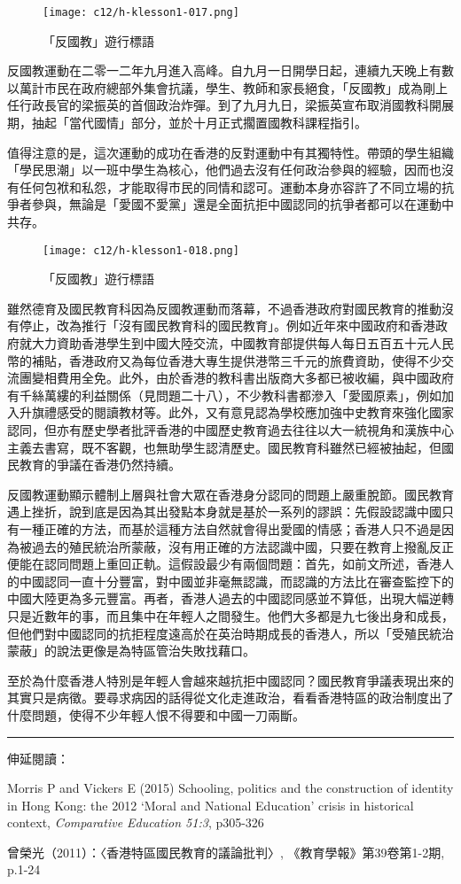 \begin{figure}[htbp]
    \centering
    \texttt{[image: c12/h-klesson1-017.png]}
    \caption{「反國教」遊行標語} 
\end{figure}

反國教運動在二零一二年九月進入高峰。自九月一日開學日起，連續九天晚上有數以萬計市民在政府總部外集會抗議，學生、教師和家長絕食，「反國教」成為剛上任行政長官的梁振英的首個政治炸彈。到了九月九日，梁振英宣布取消國教科開展期，抽起「當代國情」部分，並於十月正式擱置國教科課程指引。

值得注意的是，這次運動的成功在香港的反對運動中有其獨特性。帶頭的學生組織「學民思潮」以一班中學生為核心，他們過去沒有任何政治參與的經驗，因而也沒有任何包袱和私怨，才能取得市民的同情和認可。運動本身亦容許了不同立場的抗爭者參與，無論是「愛國不愛黨」還是全面抗拒中國認同的抗爭者都可以在運動中共存。

\begin{figure}[htbp]
    \centering
    \texttt{[image: c12/h-klesson1-018.png]}
    \caption{「反國教」遊行標語} 
\end{figure}

雖然德育及國民教育科因為反國教運動而落幕，不過香港政府對國民教育的推動沒有停止，改為推行「沒有國民教育科的國民教育」。例如近年來中國政府和香港政府就大力資助香港學生到中國大陸交流，中國教育部提供每人每日五百五十元人民幣的補貼，香港政府又為每位香港大專生提供港幣三千元的旅費資助，使得不少交流團變相費用全免。此外，由於香港的教科書出版商大多都已被收編，與中國政府有千絲萬縷的利益關係（見問題二十八），不少教科書都滲入「愛國原素」，例如加入升旗禮感受的閱讀教材等。此外，又有意見認為學校應加強中史教育來強化國家認同，但亦有歷史學者批評香港的中國歷史教育過去往往以大一統視角和漢族中心主義去書寫，既不客觀，也無助學生認清歷史。國民教育科雖然已經被抽起，但國民教育的爭議在香港仍然持續。

反國教運動顯示體制上層與社會大眾在香港身分認同的問題上嚴重脫節。國民教育遇上挫折，說到底是因為其出發點本身就是基於一系列的謬誤：先假設認識中國只有一種正確的方法，而基於這種方法自然就會得出愛國的情感；香港人只不過是因為被過去的殖民統治所蒙蔽，沒有用正確的方法認識中國，只要在教育上撥亂反正便能在認同問題上重回正軌。這假設最少有兩個問題：首先，如前文所述，香港人的中國認同一直十分豐富，對中國並非毫無認識，而認識的方法比在審查監控下的中國大陸更為多元豐富。再者，香港人過去的中國認同感並不算低，出現大幅逆轉只是近數年的事，而且集中在年輕人之間發生。他們大多都是九七後出身和成長，但他們對中國認同的抗拒程度遠高於在英治時期成長的香港人，所以「受殖民統治蒙蔽」的說法更像是為特區管治失敗找藉口。

至於為什麼香港人特別是年輕人會越來越抗拒中國認同？國民教育爭議表現出來的其實只是病徵。要尋求病因的話得從文化走進政治，看看香港特區的政治制度出了什麼問題，使得不少年輕人恨不得要和中國一刀兩斷。

\rule[-10pt]{15cm}{0.05em}

伸延閱讀：

Morris P and Vickers E (2015) Schooling, politics and the construction of identity in Hong Kong: the 2012 ‘Moral and National Education’ crisis in historical context, \textit{Comparative Education 51:3}, p305-326

曾榮光（2011）：〈香港特區國民教育的議論批判〉, 《教育學報》第39卷第1-2期, p.1-24
